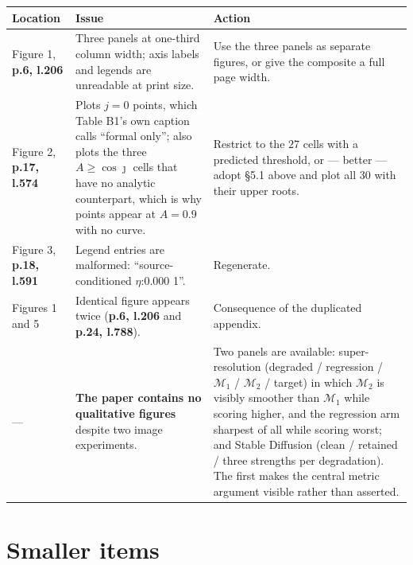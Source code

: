 \documentclass[11pt]{article}
\newcommand{\M}{\mathcal M}
\newcommand{\pl}[2]{\textbf{p.#1, l.#2}}
\begin{document}
\begin{longtable}{@{}p{}p{}p{}@{}}
\toprule
Location & Issue & Action\\
\midrule
\endhead
Figure 1, \pl{6}{206} & Three panels at one-third column width; axis labels and legends are
unreadable at print size. & Use the three panels as separate figures, or give the composite a
full page width.\\
\addlinespace
Figure 2, \pl{17}{574} & Plots $j=0$ points, which Table B1's own caption calls ``formal only'';
also plots the three $A\ge\cos\jmath$ cells that have no analytic counterpart, which is why
points appear at $A=0.9$ with no curve. & Restrict to the $27$ cells with a predicted threshold,
or --- better --- adopt \S5.1 above and plot all $30$ with their upper roots.\\
\addlinespace
Figure 3, \pl{18}{591} & Legend entries are malformed: ``source-conditioned $\eta$:0.000 1''. &
Regenerate.\\
\addlinespace
Figures 1 and 5 & Identical figure appears twice (\pl{6}{206} and \pl{24}{788}). & Consequence of
the duplicated appendix.\\
\addlinespace
--- & \textbf{The paper contains no qualitative figures} despite two image experiments. &
Two panels are available: super-resolution (degraded / regression / $\M_1$ / $\M_2$ / target) in
which $\M_2$ is visibly smoother than $\M_1$ while scoring higher, and the regression arm
sharpest of all while scoring worst; and Stable Diffusion (clean / retained / three strengths per
degradation). The first makes the central metric argument visible rather than asserted.\\
\bottomrule
\end{longtable}

\section{Smaller items}
\end{document}
